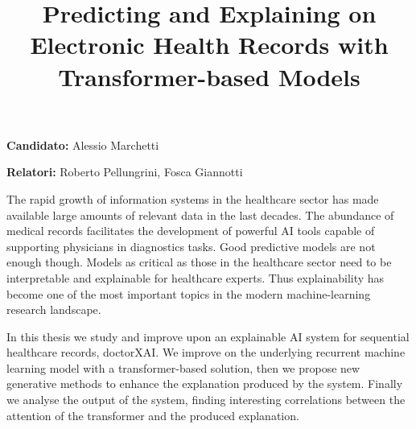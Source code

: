 \documentclass[]{marticle}
\title{\vspace{-2cm}\textbf{\huge Predicting and Explaining on Electronic Health Records with Transformer-based Models}}
\date{}
\author{}
\begin{document}
\maketitle


\textbf{Candidato:} Alessio Marchetti

\textbf{Relatori:} Roberto Pellungrini, Fosca Giannotti
\vspace{0.5cm}

The rapid growth of information systems in the healthcare sector has made available large amounts of
relevant data in the last decades. The abundance of medical records facilitates the development of
powerful AI tools capable of supporting physicians in diagnostics tasks. Good predictive models are
not enough though. Models as critical as those in the healthcare sector need to be interpretable and
explainable for healthcare experts. Thus explainability has become one of the most important topics
in the modern machine-learning research landscape.

In this thesis we study and improve upon an explainable AI system for sequential healthcare records,
doctorXAI. We improve on the underlying recurrent machine learning model with a transformer-based solution, then we propose new generative methods to enhance the explanation produced by the system.
Finally we analyse the output of the system, finding interesting correlations between the attention
of the transformer and the produced explanation.
\end{document}
